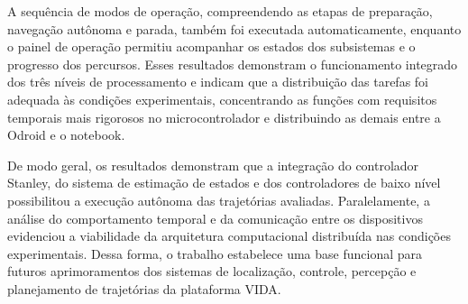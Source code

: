 A sequência de modos de operação, compreendendo as etapas de preparação, navegação autônoma e parada, também foi executada automaticamente, enquanto o painel de operação permitiu acompanhar os estados dos subsistemas e o progresso dos percursos. Esses resultados demonstram o funcionamento integrado dos três níveis de processamento e indicam que a distribuição das tarefas foi adequada às condições experimentais, concentrando as funções com requisitos temporais mais rigorosos no microcontrolador e distribuindo as demais entre a Odroid e o notebook.

De modo geral, os resultados demonstram que a integração do controlador Stanley, do sistema de estimação de estados e dos controladores de baixo nível possibilitou a execução autônoma das trajetórias avaliadas. Paralelamente, a análise do comportamento temporal e da comunicação entre os dispositivos evidenciou a viabilidade da arquitetura computacional distribuída nas condições experimentais. Dessa forma, o trabalho estabelece uma base funcional para futuros aprimoramentos dos sistemas de localização, controle, percepção e planejamento de trajetórias da plataforma VIDA.
